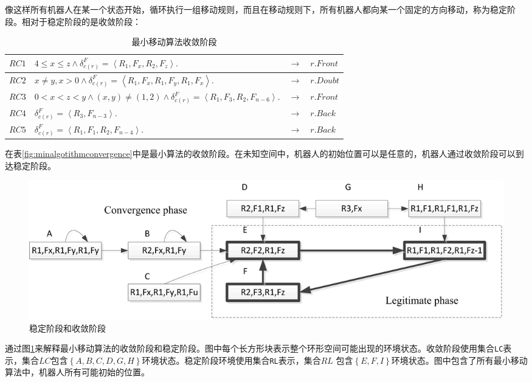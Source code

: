 像这样所有机器人在某一个状态开始，循环执行一组移动规则，而且在移动规则下，所有机器人都向某一个固定的方向移动，称为稳定阶段。相对于稳定阶段的是收敛阶段：

\begin{table}[hbt]
    \centering
    \caption{最小移动算法收敛阶段}
    \begin{tabular}{|p{2cm}|p{8cm}|p{1cm}|p{2cm}|}
        \hline
        $RC1$&$4 \leq x \leq z  \land \delta_{c\left(r\right)}^F = \left\langle R_1,F_x,R_2,F_z\right\rangle.$&$\rightarrow$&$r.Front$\\
        \hline
        $RC2$&$x \neq y,x>0 \land \delta_{c\left(r\right)}^F = \left\langle R_1,F_x,R_1,F_y,R_1,F_x\right\rangle.$&$\rightarrow$&$r.Doubt$\\
        \hline
        $RC3$&$0<x<z<y \land \left( x,y \right) \neq  \left( 1,2 \right)\land \delta_{c \left(r\right)}^F = \left\langle R_1,F_3,R_2,F_{n-6}\right\rangle.$&$\rightarrow$&$r.Front$\\
        \hline
        $RC4$&$\delta_{c\left(r\right)}^F = \left\langle R_3,F_{n-3}\right\rangle.$&$\rightarrow$&$r.Back$\\
        \hline
        $RC5$&$\delta_{c\left(r\right)}^F = \left\langle R_1,F_1,R_2,F_{n-4}\right\rangle.$&$\rightarrow$&$r.Back$\\
        \hline
    \end{tabular}
    \label{table:minalgotithmconvergence}
\end{table}

在表\ref{fig:minalgotithmconvergence}中是最小算法的收敛阶段。在未知空间中，机器人的初始位置可以是任意的，机器人通过收敛阶段可以到达稳定阶段。

\begin{figure}[!hbt]
	\centering
	\includegraphics[width=6 in]{fig/cp_lp.png}
	\caption{稳定阶段和收敛阶段}
	\label{fig:cp_lp}
\end{figure}

通过图\ref{fig:cp_lp}来解释最小移动算法的收敛阶段和稳定阶段。图中每个长方形块表示整个环形空间可能出现的环境状态。收敛阶段使用集合\verb|LC|表示，集合$LC$包含$\left\{A,B,C,D,G,H\right\}$环境状态。稳定阶段环境使用集合\verb|RL|表示，集合$RL$ 包含$\left\{E,F,I\right\}$环境状态。图中包含了所有最小移动算法中，机器人所有可能初始的位置。

